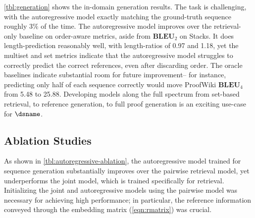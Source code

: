  \autoref{tbl:generation} shows the in-domain generation results.
The task is challenging, with the autoregressive model exactly matching the ground-truth sequence roughly 3\% of the time.
The autoregressive model improves over the retrieval-only baseline on order-aware metrics, aside from $\textbf{BLEU}_2$ on Stacks.
It does length-prediction reasonably well, with length-ratios of 0.97 and 1.18, yet the multiset and set metrics indicate that the autoregressive model struggles to correctly predict the correct references, even after discarding order.
The oracle baselines indicate substantial room for future improvement-- for instance, predicting only half of each sequence correctly would move ProofWiki $\textbf{BLEU}_4$ from 5.48 to 25.88.
Developing models along the full spectrum from set-based retrieval, to reference generation, to full proof generation is an exciting use-case for $\dsname$.

\subsection{Ablation Studies}

As shown in \autoref{tbl:autoregressive-ablation}, the autoregressive model trained for sequence generation substantially improves over the pairwise retrieval model, yet underperforms the joint model, which is trained specifically for retrieval.
Initializing the joint and autoregressive models using the pairwise model was necessary for achieving high performance; in particular, the reference information conveyed through the embedding matrix (\autoref{eqn:rmatrix}) was crucial.

